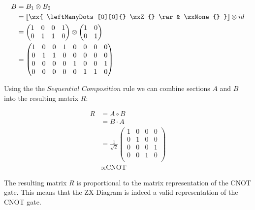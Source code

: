\begin{align*}
    B                                 & = B_1 \otimes B_2               \\
                                      & =\left \llbracket \zx{
    \leftManyDots[0][0]{} \zxZ{} \rar & \zxNone{}
    } \right \rrbracket \otimes id                                      \\
                                      & =
    \begin{pmatrix}
        1 & 0 & 0 & 1 \\
        0 & 1 & 1 & 0 \\
    \end{pmatrix}
    \otimes
    \begin{pmatrix}
        1 & 0 \\
        0 & 1 \\
    \end{pmatrix}                                                      \\
                                      & = \begin{pmatrix}
                                              1 & 0 & 0 & 1 & 0 & 0 & 0 & 0 \\
                                              0 & 1 & 1 & 0 & 0 & 0 & 0 & 0 \\
                                              0 & 0 & 0 & 0 & 1 & 0 & 0 & 1 \\
                                              0 & 0 & 0 & 0 & 0 & 1 & 1 & 0 \\
                                          \end{pmatrix}
\end{align*}


Using the the $\textit{Sequential Composition}$ rule we can combine sections $A$ and $B$ into the resulting matrix $R$:

\begin{align*}
    R & = A \circ B         \\
      & = B \cdot A         \\
      & =
    \frac{1}{\sqrt{2}}
    \begin{pmatrix}
        1 & 0 & 0 & 0 \\
        0 & 1 & 0 & 0 \\
        0 & 0 & 0 & 1 \\
        0 & 0 & 1 & 0 \\
    \end{pmatrix}          \\
      & \propto \text{CNOT}
\end{align*}

The resulting matrix $R$ is proportional to the matrix representation of the CNOT gate. This means that the ZX-Diagram \zx{
    \zxNone{} \rar & \zxNone{} \rar  &\zxZ{}\rar  &\\
    \zxNone{} \rar & \zxX{} \rar \ar[ru]  &\rar& \\
} is indeed a valid representation of the CNOT gate.


